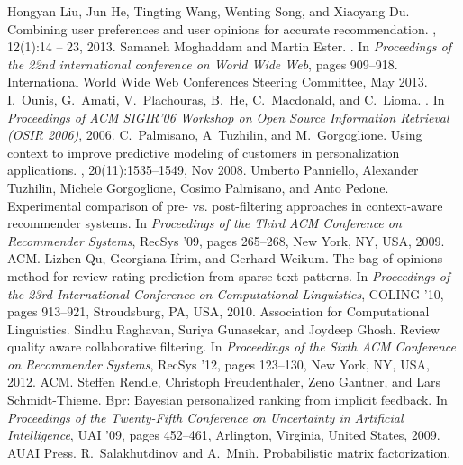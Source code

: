 \documentclass{llncs}
\begin{document}
\begin{thebibliography}{10}
Hongyan Liu, Jun He, Tingting Wang, Wenting Song, and Xiaoyang Du.
\newblock Combining user preferences and user opinions for accurate
recommendation.
, 12(1):14 -- 23,
2013.
Samaneh Moghaddam and Martin Ester.
.
\newblock In {\em Proceedings of the 22nd international conference on World
Wide Web}, pages 909--918. International World Wide Web Conferences Steering
Committee, May 2013.
I.~Ounis, G.~Amati, V.~Plachouras, B.~He, C.~Macdonald, and C.~Lioma.
.
\newblock In {\em Proceedings of ACM SIGIR'06 Workshop on Open Source
Information Retrieval (OSIR 2006)}, 2006.
C.~Palmisano, A~Tuzhilin, and M.~Gorgoglione.
\newblock Using context to improve predictive modeling of customers in
personalization applications.
,
20(11):1535--1549, Nov 2008.
Umberto Panniello, Alexander Tuzhilin, Michele Gorgoglione, Cosimo Palmisano,
and Anto Pedone.
\newblock Experimental comparison of pre- vs. post-filtering approaches in
context-aware recommender systems.
\newblock In {\em Proceedings of the Third ACM Conference on Recommender
Systems}, RecSys '09, pages 265--268, New York, NY, USA, 2009. ACM.
Lizhen Qu, Georgiana Ifrim, and Gerhard Weikum.
\newblock The bag-of-opinions method for review rating prediction from sparse
text patterns.
\newblock In {\em Proceedings of the 23rd International Conference on
Computational Linguistics}, COLING '10, pages 913--921, Stroudsburg, PA, USA,
2010. Association for Computational Linguistics.
Sindhu Raghavan, Suriya Gunasekar, and Joydeep Ghosh.
\newblock Review quality aware collaborative filtering.
\newblock In {\em Proceedings of the Sixth ACM Conference on Recommender
Systems}, RecSys '12, pages 123--130, New York, NY, USA, 2012. ACM.
Steffen Rendle, Christoph Freudenthaler, Zeno Gantner, and Lars Schmidt-Thieme.
\newblock Bpr: Bayesian personalized ranking from implicit feedback.
\newblock In {\em Proceedings of the Twenty-Fifth Conference on Uncertainty in
Artificial Intelligence}, UAI '09, pages 452--461, Arlington, Virginia,
United States, 2009. AUAI Press.
R.~Salakhutdinov and A.~Mnih.
\newblock Probabilistic matrix factorization.

\end{thebibliography}
\end{document}
